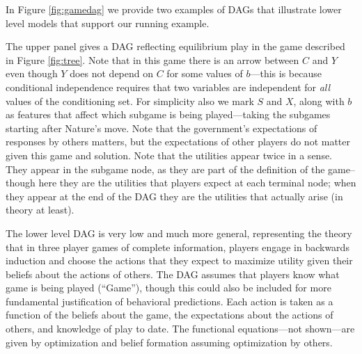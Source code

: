 \documentclass[12pt,]{book}
\begin{document}
In Figure \ref{fig:gamedag} we provide two examples of DAGs that illustrate lower level models that support our running example.

The upper panel gives a DAG reflecting equilibrium play in the game described in Figure \ref{fig:tree}. Note that in this game there is an arrow between \(C\) and \(Y\) even though \(Y\) does not depend on \(C\) for some values of \(b\)---this is because conditional independence requires that two variables are independent for \emph{all} values of the conditioning set. For simplicity also we mark \(S\) and \(X\), along with \(b\) as features that affect which subgame is being played---taking the subgames starting after Nature's move. Note that the government's expectations of responses by others matters, but the expectations of other players do not matter given this game and solution. Note that the utilities appear twice in a sense. They appear in the subgame node, as they are part of the definition of the game--though here they are the utilities that players expect at each terminal node; when they appear at the end of the DAG they are the utilities that actually arise (in theory at least).

The lower level DAG is very low and much more general, representing the theory that in three player games of complete information, players engage in backwards induction and choose the actions that they expect to maximize utility given their beliefs about the actions of others. The DAG assumes that players know what game is being played (``Game''), though this could also be included for more fundamental justification of behavioral predictions. Each action is taken as a function of the beliefs about the game, the expectations about the actions of others, and knowledge of play to date. The functional equations---not shown---are given by optimization and belief formation assuming optimization by others.
\end{document}
